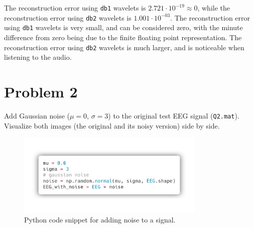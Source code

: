 The reconstruction error using \texttt{db1} wavelets is $2.721 \cdot 10^{-19} \approx 0$, while the reconstruction error using \texttt{db2} wavelets is $1.001 \cdot 10^{-03}$. The reconstruction error using \texttt{db1} wavelets is very small, and can be considered zero, with the minute difference from zero being due to the finite floating point representation. The reconstruction error using \texttt{db2} wavelets is much larger, and is noticeable when listening to the audio.


\section*{Problem 2} \label{sec:problem2}

\begin{tcolorbox}[colback=green!5!white,boxrule=0pt,frame empty]
    Add Gaussian noise ($\mu = 0$, $\sigma = 3$) to the original test
    EEG signal (\verb|Q2.mat|).
    Visualize both images (the original and its noisy version) side by side.
\end{tcolorbox}


\begin{figure}[H]
    \centering
    \includegraphics[width=0.8\textwidth]{./img/code_snippets/applying_noise_to_signal.png}
    \caption{Python code snippet for adding noise to a signal.}
    \label{code_snippet:applying_noise_to_signal}
\end{figure}

